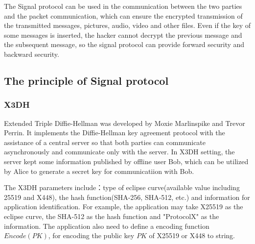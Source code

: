 \documentclass[11pt,en]{elegantpaper}
\begin{document}
The Signal protocol can be used in the communication between the two parties and the packet communication, which can ensure the encrypted transmission of the transmitted messages, pictures, audio, video and other files. Even if the key of some messages is inserted, the hacker cannot decrypt the previous message and the subsequent message, so the signal protocol can provide forward security and backward security.

\subsection{The principle of Signal protocol}


\subsubsection{X3DH}
Extended Triple Diffie-Hellman was developed by Moxie Marlinspike and Trevor Perrin\cite{marlinspike2016x3dh}. It implements the Diffie-Hellman key agreement protocol with the assistance of a central server so that both parties can communicate asynchronously and communicate only with the server. In X3DH setting, the server kept some information published by offline user Bob, which can be utilized by Alice to generate a secret key for communicatiion with Bob.

The X3DH parameters include：type of eclipse curve(available value including 25519 and X448)\cite{marlinspike2016x3dh}, the hash function(SHA-256, SHA-512, etc.) and information for application identification. For example, the application may take X25519 as the eclipse curve, the SHA-512 as the hash function and "ProtocolX" as the information. The application also need to define a encoding function $Encode(PK)$, for encoding the public key $PK$ of X25519 or X448 to string.
\end{document}
